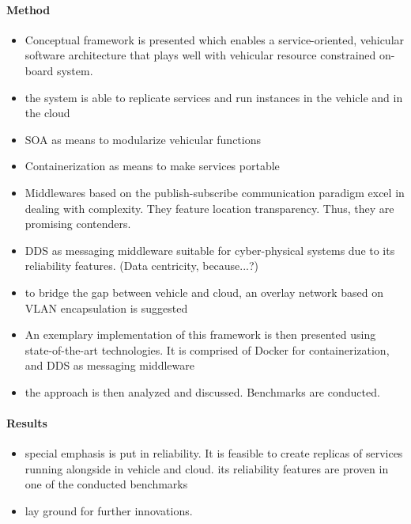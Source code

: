 \noindent
\paragraph{Method}
\begin{itemize}
\item Conceptual framework is presented which enables a service-oriented, vehicular software architecture that plays well with vehicular resource constrained on-board system.
\item the system is able to replicate services and run instances in the vehicle and in the cloud
\item SOA as means to modularize vehicular functions 
\item Containerization as means to make services portable
\item Middlewares based on the publish-subscribe communication paradigm excel in dealing with complexity. They feature location transparency. Thus, they are promising contenders. 
\item DDS as messaging middleware suitable for cyber-physical systems due to its reliability features. (Data centricity, because...?)
\item to bridge the gap between vehicle and cloud, an overlay network based on VLAN encapsulation is suggested
\item  An exemplary implementation of this framework is then presented using state-of-the-art technologies. It is comprised of Docker for containerization, and DDS as messaging middleware
\item the approach is then analyzed and discussed. Benchmarks are conducted.
\end{itemize}

\noindent
\paragraph{Results}
\begin{itemize}
\item special emphasis is put in reliability. It is feasible to create replicas of services running alongside in vehicle and cloud.
its reliability features are proven in one of the conducted benchmarks
\item lay ground for further innovations.
\end{itemize}
